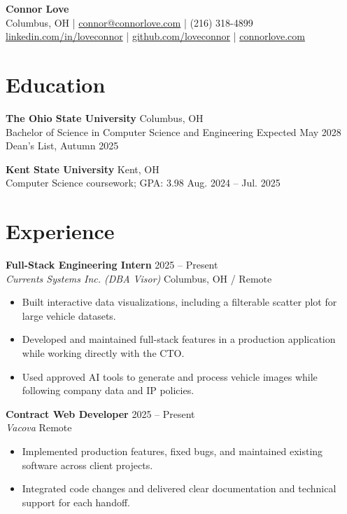 \documentclass[10pt]{article}
\begin{document}
\begin{center}
  {\LARGE \textbf{Connor Love}}\\[3pt]
  \small
  Columbus, OH \quad | \quad
  \href{mailto:connor@connorlove.com}{connor@connorlove.com} \quad | \quad
  (216) 318-4899\\[2pt]
  \href{https://www.linkedin.com/in/loveconnor}{linkedin.com/in/loveconnor} \quad | \quad
  \href{https://github.com/loveconnor}{github.com/loveconnor} \quad | \quad
  \href{https://www.connorlove.com}{connorlove.com}
\end{center}

\section*{Education}
\textbf{The Ohio State University} \hfill Columbus, OH\\
Bachelor of Science in Computer Science and Engineering \hfill Expected May 2028\\
Dean's List, Autumn 2025

\vspace{3pt}
\textbf{Kent State University} \hfill Kent, OH\\
Computer Science coursework; GPA: 3.98 \hfill Aug. 2024 -- Jul. 2025

\section*{Experience}
\textbf{Full-Stack Engineering Intern} \hfill 2025 -- Present\\
\textit{Currents Systems Inc. (DBA Visor)} \hfill Columbus, OH / Remote
\begin{itemize}
  \item Built interactive data visualizations, including a filterable scatter plot for large vehicle datasets.
  \item Developed and maintained full-stack features in a production application while working directly with the CTO.
  \item Used approved AI tools to generate and process vehicle images while following company data and IP policies.
\end{itemize}

\textbf{Contract Web Developer} \hfill 2025 -- Present\\
\textit{Vacova} \hfill Remote
\begin{itemize}
  \item Implemented production features, fixed bugs, and maintained existing software across client projects.
  \item Integrated code changes and delivered clear documentation and technical support for each handoff.
\end{itemize}
\end{document}
